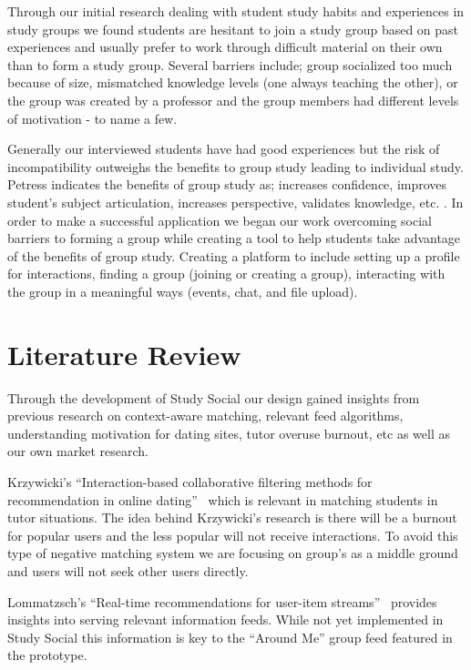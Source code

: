 \documentclass{sigchi-ext}
\begin{document}
Through our initial research dealing with student study habits and experiences
in study groups we found students are hesitant to join a study group based on
past experiences and usually prefer to work through difficult material on
their own than to form a study group. Several barriers include; group
socialized too much because of size, mismatched knowledge levels (one always
teaching the other), or the group was created by a professor and the group
members had different levels of motivation - to name a few.

Generally our interviewed students have had good experiences but the risk of
incompatibility outweighs the benefits to group study leading to individual
study. Petress indicates the benefits of group study as; increases confidence,
improves student's subject articulation, increases perspective, validates
knowledge, etc. \cite{petress2004benefits}. In order to make a successful
application we began our work overcoming social barriers to forming a group
while creating a tool to help students take advantage of the benefits of group
study. Creating a platform to include setting up a profile for interactions,
finding a group (joining or creating a group), interacting with the group in a
meaningful ways (events, chat, and file upload).



\section{Literature Review}
Through the development of Study Social our design gained insights from
previous research on context-aware matching, relevant feed algorithms,
understanding motivation for dating sites, tutor overuse burnout, etc as well
as our own market research.

Krzywicki's ``Interaction-based collaborative filtering methods for
recommendation in online dating''~\cite{krzywicki2010interaction} which is
relevant in matching students in tutor situations. The idea behind
Krzywicki's research is there will be a burnout for popular users and the
less popular will not receive interactions.  To avoid this type of negative
matching system we are focusing on group's as a middle ground and users will
not seek other users directly.

Lommatzsch's ``Real-time recommendations for user-item
streams''~\cite{lommatzsch2015real} provides insights into serving relevant
information feeds. While not yet implemented in Study Social this information
is key to the ``Around Me'' group feed featured in the prototype.
\end{document}
